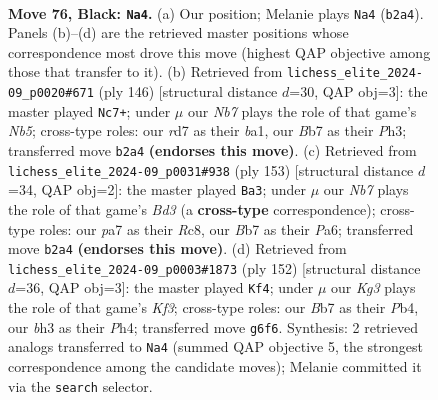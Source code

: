 \documentclass[11pt]{article}
\begin{document}
\clearpage

\begin{figure}[p]\centering
\begin{subfigure}{0.46\textwidth}\centering
\resizebox{\linewidth}{!}{%
\newchessgame
\chessboard[
  setfen={8/PbNR4/6k1/8/1p3P2/6PB/1n2K2P/8 b - - 21 76},
  showmover=false,
  pgfstyle=straightmove, color=movearrow, markmove={b2-a4}
]}
\caption{}
\end{subfigure}\hfill
\begin{subfigure}{0.46\textwidth}\centering
\resizebox{\linewidth}{!}{%
\newchessgame
\chessboard[
  setfen={8/5p2/6pB/1N1kp2p/8/3K3P/6P1/b7 w - - 12 74},
  showmover=false,
  pgfstyle=straightmove, color=movearrow, markmove={b5-c7}
]}
\caption{}
\end{subfigure}
\\[4pt]
\begin{subfigure}{0.46\textwidth}\centering
\resizebox{\linewidth}{!}{%
\newchessgame
\chessboard[
  setfen={2r5/5R2/p2b2P1/P5K1/4k3/8/5B2/8 b - - 8 77},
  showmover=false,
  pgfstyle=straightmove, color=movearrow, markmove={d6-a3}
]}
\caption{}
\end{subfigure}\hfill
\begin{subfigure}{0.46\textwidth}\centering
\resizebox{\linewidth}{!}{%
\newchessgame
\chessboard[
  setfen={8/3bk3/2p3Bp/1p1p4/1P1P3P/5K2/8/8 w - - 12 77},
  showmover=false,
  pgfstyle=straightmove, color=movearrow, markmove={f3-f4}
]}
\caption{}
\end{subfigure}
\caption{\textbf{Move 76, Black: \texttt{Na4}.} (a) Our position; Melanie plays \texttt{Na4} (\texttt{b2a4}). Panels (b)--(d) are the retrieved master positions whose correspondence most drove this move (highest QAP objective among those that transfer to it). (b) Retrieved from \texttt{lichess\_elite\_2024-09\_p0020\#671} (ply 146) [structural distance $d$=30, QAP obj=3]: the master played \texttt{Nc7+}; under $\mu$ our \emph{Nb7} plays the role of that game's \emph{Nb5}; cross-type roles: our \emph{r}d7 as their \emph{b}a1, our \emph{B}b7 as their \emph{P}h3; transferred move \texttt{b2a4} \textbf{(endorses this move)}. (c) Retrieved from \texttt{lichess\_elite\_2024-09\_p0031\#938} (ply 153) [structural distance $d$=34, QAP obj=2]: the master played \texttt{Ba3}; under $\mu$ our \emph{Nb7} plays the role of that game's \emph{Bd3} (a \textbf{cross-type} correspondence); cross-type roles: our \emph{p}a7 as their \emph{R}c8, our \emph{B}b7 as their \emph{P}a6; transferred move \texttt{b2a4} \textbf{(endorses this move)}. (d) Retrieved from \texttt{lichess\_elite\_2024-09\_p0003\#1873} (ply 152) [structural distance $d$=36, QAP obj=3]: the master played \texttt{Kf4}; under $\mu$ our \emph{Kg3} plays the role of that game's \emph{Kf3}; cross-type roles: our \emph{B}b7 as their \emph{P}b4, our \emph{b}h3 as their \emph{P}h4; transferred move \texttt{g6f6}. Synthesis: 2 retrieved analogs transferred to \texttt{Na4} (summed QAP objective 5, the strongest correspondence among the candidate moves); Melanie committed it via the \texttt{search} selector.}
\label{fig:thought-m151}
\end{figure}
\end{document}
